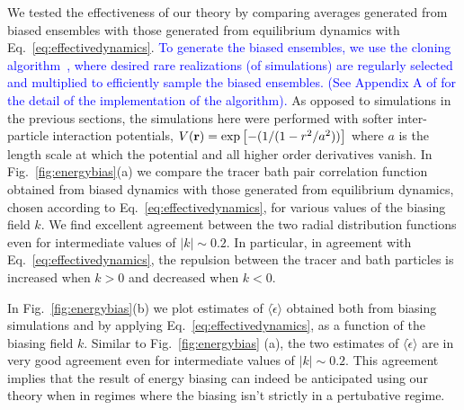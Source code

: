 \documentclass[pre, superscriptaddress, twocolumn,pre]{revtex4-1}
\begin{document}
We tested the effectiveness of our theory by comparing averages generated from biased ensembles with those generated from equilibrium dynamics with Eq.~\ref{eq:effectivedynamics}. 
\textcolor{blue}{To generate the biased ensembles, we use the cloning algorithm~\cite{Giadina2006,tailleur2007probing,Hurtado2009,Nemoto2016,Ray2018,Klymko2018,Brewer2018}, where desired rare realizations (of simulations) are regularly selected and multiplied to efficiently sample the biased ensembles. (See Appendix A of \cite{Nemoto2016} for the detail of the implementation of the algorithm).}  
As opposed to simulations in the previous sections, the simulations here were performed with softer inter-particle interaction potentials, $V({\bf r})=\exp\left[-(1/(1-r^2/a^2))\right]$ where $a$ is the length scale at which the potential and all higher order derivatives vanish. In Fig.~\ref{fig:energybias}(a) we compare the tracer bath pair correlation function obtained from biased dynamics with those generated from equilibrium dynamics, chosen according to Eq.~\ref{eq:effectivedynamics}, for various values of the biasing field $k$. We find excellent agreement between the two radial distribution functions even for intermediate values of $|k|\sim 0.2$. In particular, in agreement with Eq.~\ref{eq:effectivedynamics}, the repulsion between the tracer and bath particles is increased when $k>0$ and decreased when $k<0$. 

In Fig.~\ref{fig:energybias}(b) we plot estimates of $\langle \dot{\epsilon} \rangle$ obtained both from biasing simulations and by applying Eq.~\ref{eq:effectivedynamics}, as a function of the biasing field $k$. Similar to Fig.~\ref{fig:energybias} (a), the two estimates of $\langle\dot{\epsilon}\rangle$ are in very good agreement even for intermediate values of $|k|\sim 0.2$. 
This agreement implies that the result of energy biasing can indeed be anticipated using our theory when in regimes where the biasing isn't strictly in a pertubative regime.
\end{document}
